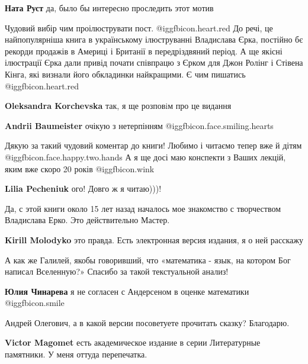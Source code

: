 \begin{itemize}
\begin{itemize} %
\textbf{Ната Руст} да, было бы интересно проследить этот мотив
\end{itemize} %


Чудовий вибір чим проілюструвати пост. @igg{fbicon.heart.red} До речі, це найпопулярніша книга в
українському ілюструванні Владислава Єрка, постійно бє рекорди продажів в
Америці і Британії в передріздвяний період. А ще якісні ілюстрації Єрка дали
привід почати співпрацю з Єрком для Джон Ролінг і Стівена Кінга, які визнали
його обкладинки найкращими. Є чим пишатись @igg{fbicon.heart.red}

\begin{itemize} %
\textbf{Oleksandra Korchevska} так, я ще розповiм про це видання

\textbf{Andrii Baumeister} очікую з нетерпінням  @igg{fbicon.face.smiling.hearts} 
\end{itemize} %


Дякую за такий чудовий коментар до книги! Любимо і читаємо тепер вже й дітям  @igg{fbicon.face.happy.two.hands} 
А я ще досі маю конспекти з Ваших лекцій, яким вже скоро 20 років @igg{fbicon.wink} 

\textbf{Lilia Pecheniuk} ого! Довго ж я читаю)))!

Да, с этой книги около 15 лет назад началось мое знакомство с творчеством Владислава Ерко. Это действительно Мастер.


\textbf{Kirill Molodyko} это правда. Есть электронная версия издания, я о ней расскажу


А как же Галилей, якобы говоривший, что «математика - язык, на котором Бог
написал Вселенную?» Спасибо за такой текстуальной анализ!

\textbf{Юлия Чинарева} я не согласен с Андерсеном в оценке математики  @igg{fbicon.smile} 

Андрей Олегович, а в какой версии посоветуете прочитать сказку? Благодарю.

\begin{itemize} %
\textbf{Victor Magomet} есть академическое издание в серии Литературные памятники. У меня оттуда перепечатка.


\end{itemize}
\end{itemize}
